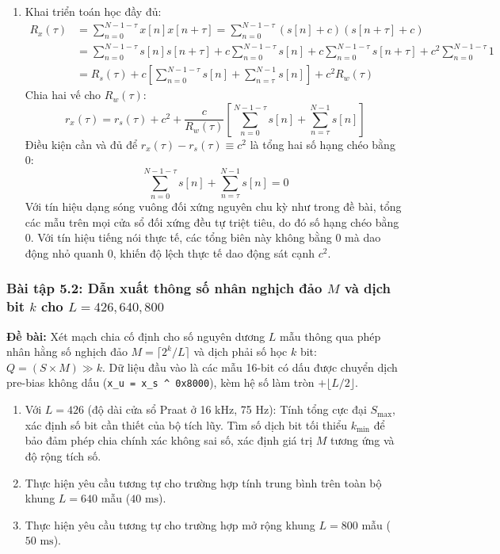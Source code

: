 \begin{enumerate}[label=(\alph*)]
    \item Khai triển toán học đầy đủ:
    \begin{align}
    R_x(\tau) &= \sum_{n=0}^{N-1-\tau} x[n] x[n+\tau] = \sum_{n=0}^{N-1-\tau} (s[n] + c)(s[n+\tau] + c) \nonumber \\
    &= \sum_{n=0}^{N-1-\tau} s[n]s[n+\tau] + c \sum_{n=0}^{N-1-\tau} s[n] + c \sum_{n=0}^{N-1-\tau} s[n+\tau] + c^2 \sum_{n=0}^{N-1-\tau} 1 \nonumber \\
    &= R_s(\tau) + c \left[ \sum_{n=0}^{N-1-\tau} s[n] + \sum_{n=\tau}^{N-1} s[n] \right] + c^2 R_w(\tau)
    \end{align}
    Chia hai vế cho $R_w(\tau)$:
    \begin{equation}
    r_x(\tau) = r_s(\tau) + c^2 + \frac{c}{R_w(\tau)} \left[ \sum_{n=0}^{N-1-\tau} s[n] + \sum_{n=\tau}^{N-1} s[n] \right]
    \end{equation}
    Điều kiện cần và đủ để $r_x(\tau) - r_s(\tau) \equiv c^2$ là tổng hai số hạng chéo bằng 0:
    \begin{equation}
    \sum_{n=0}^{N-1-\tau} s[n] + \sum_{n=\tau}^{N-1} s[n] = 0
    \end{equation}
    Với tín hiệu dạng sóng vuông đối xứng nguyên chu kỳ như trong đề bài, tổng các mẫu trên mọi cửa sổ đối xứng đều tự triệt tiêu, do đó số hạng chéo bằng 0. Với tín hiệu tiếng nói thực tế, các tổng biên này không bằng 0 mà dao động nhỏ quanh 0, khiến độ lệch thực tế dao động sát cạnh $c^2$.
\end{enumerate}

\subsubsection*{Bài tập 5.2: Dẫn xuất thông số nhân nghịch đảo $M$ và dịch bit $k$ cho $L = 426, 640, 800$}
\textbf{Đề bài:} Xét mạch chia cố định cho số nguyên dương $L$ mẫu thông qua phép nhân hằng số nghịch đảo $M = \lceil 2^k / L \rceil$ và dịch phải số học $k$ bit: $Q = (S \times M) \gg k$. Dữ liệu đầu vào là các mẫu 16-bit có dấu được chuyển dịch pre-bias không dấu (\texttt{x\_u = x\_s \^{} 0x8000}), kèm hệ số làm tròn $+ \lfloor L/2 \rfloor$.
\begin{enumerate}[label=(\alph*)]
    \item Với $L = 426$ (độ dài cửa sổ Praat ở 16 kHz, 75 Hz): Tính tổng cực đại $S_{\text{max}}$, xác định số bit cần thiết của bộ tích lũy. Tìm số dịch bit tối thiểu $k_{\min}$ để bảo đảm phép chia chính xác không sai số, xác định giá trị $M$ tương ứng và độ rộng tích số.
    \item Thực hiện yêu cầu tương tự cho trường hợp tính trung bình trên toàn bộ khung $L = 640$ mẫu ($40\text{ ms}$).
    \item Thực hiện yêu cầu tương tự cho trường hợp mở rộng khung $L = 800$ mẫu ($50\text{ ms}$).
\end{enumerate}


